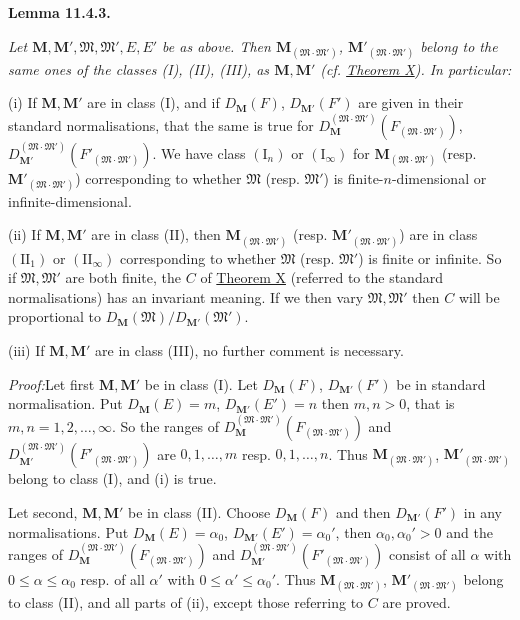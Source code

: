 \documentclass[12pt,b5paper,twoside]{article}
\newcommand{\M}{\mathbf M}
\newcommand{\Lemma}[1]{%
  \par\smallskip\noindent\phantomsection\label{lem:#1}\textbf{Lemma #1.}\enspace
}
\newcommand{\Proof}{\par\noindent\textit{Proof:}\enspace}
\newcommand{\thmref}[1]{\hyperref[thm:#1]{Theorem #1}}
\begin{document}
\Lemma{11.4.3}
{\itshape
Let $\M,\M',\mathfrak M,\mathfrak M',E,E'$ be as above. Then
$\M_{(\mathfrak M\cdot\mathfrak M')}$,
$\M'_{(\mathfrak M\cdot\mathfrak M')}$ belong to the same ones of the
classes (I), (II), (III), as $\M,\M'$ (cf. \thmref{X}). In particular:

(i) If $\M,\M'$ are in class (I), and if $D_{\M}(F)$,
$D_{\M'}(F')$ are given in their standard normalisations, that the same is
true for
$D_{\M}^{(\mathfrak M\cdot\mathfrak M')}
(F_{(\mathfrak M\cdot\mathfrak M')})$,
$D_{\M'}^{(\mathfrak M\cdot\mathfrak M')}
(F'_{(\mathfrak M\cdot\mathfrak M')})$. We have class
$(\mathrm I_n)$ or $(\mathrm I_\infty)$ for
 $\M_{(\mathfrak M\cdot\mathfrak M')}$ (resp.
$\M'_{(\mathfrak M\cdot\mathfrak M')}$) corresponding to whether
 $\mathfrak M$ (resp. $\mathfrak M'$) is finite-$n$-dimensional or
infinite-dimensional.

(ii) If $\M,\M'$ are in class (II), then
 $\M_{(\mathfrak M\cdot\mathfrak M')}$ (resp.
$\M'_{(\mathfrak M\cdot\mathfrak M')}$) are in class
$(\mathrm{II}_1)$ or $(\mathrm{II}_\infty)$ corresponding to whether
 $\mathfrak M$ (resp. $\mathfrak M'$) is finite or infinite. So if
$\mathfrak M,\mathfrak M'$ are both finite, the $C$ of \thmref{X}
(referred to the standard normalisations) has an invariant meaning. If we
then vary $\mathfrak M,\mathfrak M'$ then $C$ will be proportional to
$D_{\M}(\mathfrak M)/D_{\M'}(\mathfrak M')$.

(iii) If $\M,\M'$ are in class (III), no further comment is necessary.}

\Proof Let first $\M,\M'$ be in class (I). Let $D_{\M}(F)$,
$D_{\M'}(F')$ be in standard normalisation. Put
$D_{\M}(E)=m$, $D_{\M'}(E')=n$ then $m,n>0$, that is
$m,n=1,2,\ldots,\infty$. So the ranges of
$D_{\M}^{(\mathfrak M\cdot\mathfrak M')}
(F_{(\mathfrak M\cdot\mathfrak M')})$ and
$D_{\M'}^{(\mathfrak M\cdot\mathfrak M')}
(F'_{(\mathfrak M\cdot\mathfrak M')})$ are
 $0,1,\ldots,m$ resp. $0,1,\ldots,n$. Thus
$\M_{(\mathfrak M\cdot\mathfrak M')}$,
$\M'_{(\mathfrak M\cdot\mathfrak M')}$ belong to class (I), and (i) is
true.

Let second, $\M,\M'$ be in class (II). Choose $D_{\M}(F)$ and then
$D_{\M'}(F')$ in any normalisations. Put
$D_{\M}(E)=\alpha_0$, $D_{\M'}(E')=\alpha_0'$, then
$\alpha_0,\alpha_0'>0$ and the ranges of
$D_{\M}^{(\mathfrak M\cdot\mathfrak M')}
(F_{(\mathfrak M\cdot\mathfrak M')})$ and
$D_{\M'}^{(\mathfrak M\cdot\mathfrak M')}
(F'_{(\mathfrak M\cdot\mathfrak M')})$ consist of all $\alpha$ with
 $0\leq\alpha\leq\alpha_0$ resp. of all $\alpha'$ with
$0\leq\alpha'\leq\alpha_0'$. Thus
$\M_{(\mathfrak M\cdot\mathfrak M')}$,
$\M'_{(\mathfrak M\cdot\mathfrak M')}$ belong to class (II), and all
parts of (ii), except those referring to $C$ are proved.
\end{document}
